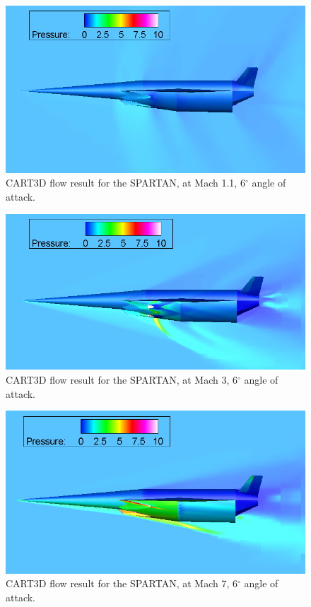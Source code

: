 \begin{figure}
	\centering
	\includegraphics[width=0.7\linewidth]{figures/3_vehicle_design/M1p1AoA6}
	\caption{CART3D flow result for the SPARTAN, at Mach 1.1, 6$^\circ$ angle of attack.}
	\label{fig:M1}
\end{figure}
\begin{figure}
	\centering
	\includegraphics[width=0.7\linewidth]{figures/3_vehicle_design/M3AoA6}
	\caption{CART3D flow result for the SPARTAN, at Mach 3, 6$^\circ$ angle of attack.}
	\label{fig:M3AoA6}
\end{figure}
\begin{figure}
	\centering
	\includegraphics[width=0.7\linewidth]{figures/3_vehicle_design/M7AoA6}
	\caption{CART3D flow result for the SPARTAN, at Mach 7, 6$^\circ$ angle of attack.}
	\label{fig:M7AoA6}
\end{figure}


